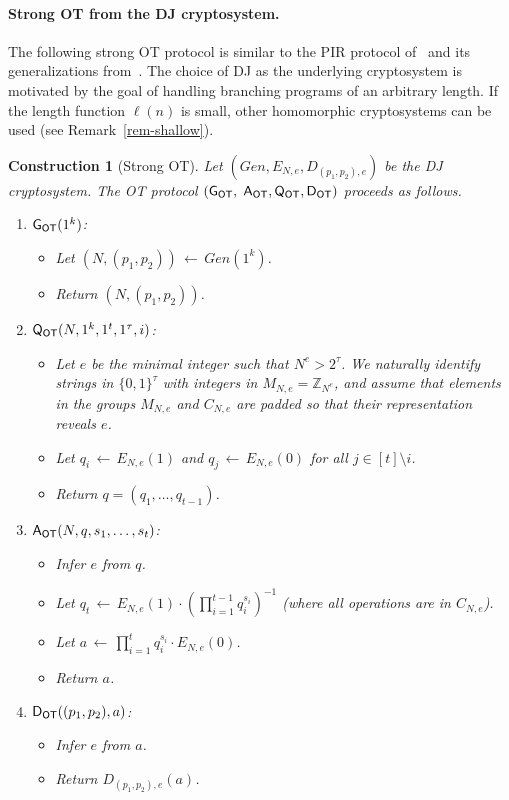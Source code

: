 \documentclass[11pt]{article}
\newtheorem{construction}[theorem]{Construction}
\newcommand{\from}{{\,\leftarrow\,}}
\newcommand{\genot}{{\sf G_{OT}}}
\newcommand{\queot}{{\sf Q_{OT}}}
\newcommand{\ansot}{{\sf A_{OT}}}
\newcommand{\decot}{{\sf D_{OT}}}
\newcommand{\otl}{{\tau}}
\newcommand{\gendj}{Gen}
\newcommand{\encdj}{{E}_{N,e}}
\newcommand{\decdj}{{D}_{(p_1,p_2),e}}
\newcommand{\Z}{\mathbb{Z}}
\newcommand{\mathify}[1]{\ifmmode{#1}\else\mbox{$#1$}\fi}
\newcommand{\opbrange}[3][,]{#2#1\ldots#1#3}
\newcommand{\size}[1]{\mathify{\left| #1 \right|}}
\begin{document}
\paragraph{\bf Strong OT from the DJ cryptosystem.}
The following strong OT protocol is similar to the PIR protocol
of~\cite{KO97} and its generalizations
from~\cite{Ste98,L04}.
The choice of DJ as the underlying cryptosystem is
motivated by the goal of handling branching programs of an
arbitrary length. If the length function $\ell(n)$ is small, other
homomorphic cryptosystems can be used (see
Remark~\ref{rem-shallow}).
\begin{construction}[Strong OT]
\rm \label{con-otimpl-smh} Let $(\gendj,\encdj,\decdj)$ be the DJ
cryptosystem. The OT protocol $(\genot,$ $\ansot,\queot,\decot)$
proceeds as follows.
\begin{enumerate}
\item $\genot(1^k)$:
\begin{itemize}
  \item Let $(N,(p_1,p_2))\from\gendj(1^k)$.
  \item Return $(N,(p_1,p_2))$.
\end{itemize}
\item $\queot(N,1^k,1^t,1^{\otl},i)$:
\begin{itemize}
  \item Let $e$ be the minimal integer such that $N^e > 2^\otl$. We
  naturally identify strings in $\{0,1\}^\otl$ with integers in
  $M_{N,e}=\Z_{N^e}$, and assume that elements in the groups
  $M_{N,e}$ and $C_{N,e}$ are padded so that their representation
  reveals $e$.
  \item Let $q_i\from\encdj(1)$ and $q_j\from\encdj(0)$ for all
  $j\in[t]\setminus i$.
  \item Return $q=(q_1,\ldots,q_{t-1})$.
\end{itemize}
\item $\ansot(N,q,\opbrange{s_1}{s_t})$:
\begin{itemize}
\item Infer $e$ from $q$.
\item Let $q_t\from\encdj(1)\cdot
(\prod_{i=1}^{t-1}{q_i^{s_i}})^{-1}$ (where all operations are in
$C_{N,e}$).
\item Let $a\from\prod_{i=1}^t q_i^{s_i}\cdot\encdj(0)$.
\item Return $a$.
\end{itemize}
\item $\decot((p_1,p_2),a)$:
\begin{itemize}
\item Infer $e$ from $a$.
\item Return $\decdj(a)$.
\end{itemize}
\end{enumerate}
\end{construction}
\end{document}
